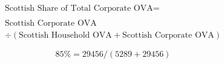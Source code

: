 \begin{enumerate}
\begin{equation}
\begin{split}
\text{Scottish Share of Total Corporate OVA} =  \\ \\
\text{Scottish Corporate OVA}\\ 
\div (\text{Scottish Household OVA}+ \text{Scottish Corporate OVA}) 
\end{split} \label{eq:2.5.84}
\end{equation}

\begin{equation} \nonumber
85\% = 29456/(5289+29456)
\end{equation}\\



\end{enumerate}

\pagebreak


